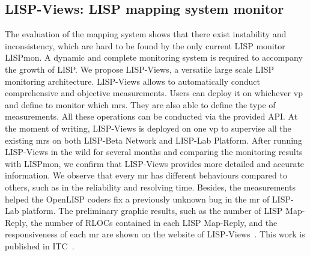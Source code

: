 \subsection{LISP-Views: LISP mapping system monitor}
The evaluation of the mapping system shows that there exist instability and inconsistency, which are hard to be found by the only current LISP monitor LISPmon. A dynamic and complete monitoring system is required to accompany the growth of LISP. We propose LISP-Views, a versatile large scale LISP monitoring architecture. LISP-Views allows to automatically conduct comprehensive and objective measurements. Users can deploy it on whichever \acrshort{vp} and define to monitor which \acrshort{mr}s. They are also able to define the type of measurements. All these operations can be conducted via the provided API. At the moment of writing, LISP-Views is deployed on one \acrshort{vp} to supervise all the existing \acrshort{mr}s on both LISP-Beta Network and LISP-Lab Platform. After running LISP-Views in the wild for several months and comparing the monitoring results with LISPmon, we confirm that LISP-Views provides more detailed and accurate information. We observe that every \acrshort{mr} has different behaviours compared to others, such as in the reliability and resolving time. Besides, the measurements helped the OpenLISP coders fix a previously unknown bug in the \acrshort{mr} of LISP-Lab platform. The preliminary graphic results, such as the number of LISP Map-Reply, the number of RLOCs contained in each LISP Map-Reply, and the responsiveness of each \acrshort{mr} are shown on the website of LISP-Views~\cite{lispviews}. This work is published in ITC~\cite{li2017lisp}.

